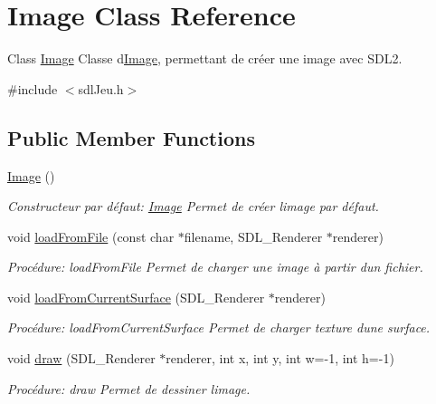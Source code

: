 \hypertarget{classImage}{}\section{Image Class Reference}
\label{classImage}


Class \hyperlink{classImage}{Image} Classe d\textquotesingle{}\hyperlink{classImage}{Image}, permettant de créer une image avec S\+D\+L2.  




{\ttfamily \#include $<$sdl\+Jeu.\+h$>$}

\subsection*{Public Member Functions}
\begin{DoxyCompactItemize}
\item 
\hyperlink{classImage_a58edd1c45b4faeb5f789b0d036d02313}{Image} ()
\begin{DoxyCompactList}\small\item\em Constructeur par défaut\+: \hyperlink{classImage}{Image} Permet de créer l\textquotesingle{}image par défaut. \end{DoxyCompactList}\item 
void \hyperlink{classImage_aa276b5183099671ddeaf8f083068046c}{load\+From\+File} (const char $\ast$filename, S\+D\+L\+\_\+\+Renderer $\ast$renderer)
\begin{DoxyCompactList}\small\item\em Procédure\+: load\+From\+File Permet de charger une image à partir d\textquotesingle{}un fichier. \end{DoxyCompactList}\item 
void \hyperlink{classImage_aee71e67e123b6fdd1d3c91caa2892792}{load\+From\+Current\+Surface} (S\+D\+L\+\_\+\+Renderer $\ast$renderer)
\begin{DoxyCompactList}\small\item\em Procédure\+: load\+From\+Current\+Surface Permet de charger texture d\textquotesingle{}une surface. \end{DoxyCompactList}\item 
void \hyperlink{classImage_a82d6936d466ba0161d8b9cbacf613de5}{draw} (S\+D\+L\+\_\+\+Renderer $\ast$renderer, int x, int y, int w=-\/1, int h=-\/1)
\begin{DoxyCompactList}\small\item\em Procédure\+: draw Permet de dessiner l\textquotesingle{}image. \end{DoxyCompactList}\item 

\end{DoxyCompactItemize}
